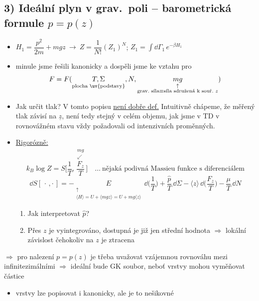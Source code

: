 {\color{NavyBlue}
\subsection*{3) Ideální plyn v grav.\ poli -- barometrická formule $p = p(z)$}
\begin{itemize}
  \item $H_1 = \dfrac{p^2}{2m} + mgz \ \to\ Z = \dfrac{1}{N!}(Z_1)^N$; \quad $Z_1 = \displaystyle\int\dd\Gamma_1\,e^{-\beta H_1}$
  \item minule jsme řešili kanonicky a dospěli jsme ke vztahu pro 
        \[
          F = F(\underset{\text{plocha \uv{podstavy}}}{T,\Sigma},N,\underset{\substack{\uparrow\\ \text{grav.\ síla} \equiv \text{síla sdružená k souř.\ } z}}{mg})
        \]
  \item Jak určit tlak?  V tomto popisu \underline{není dobře def.} Intuitivně chápeme, že  měřený tlak závisí
        na $\underline z$, není tedy stejný v celém objemu, jak jsme v TD v rovnovážném stavu vždy požadovali od intenzivních proměnných.
  \item \underline{Rigorózně:}
        \[
          k_B\log Z = S\Big[\frac1T,\overset{\substack{mg\\ \swarrow}}{\frac{F_z}{T}}\Big]
          \quad\dots\ \text{nějaká podivná Massieu funkce s diferenciálem}
        \]
        \[
          \dd S[\,\cdot\,,\cdot\,] = -\underset{\substack{\uparrow\\ \langle H\rangle = U + \langle mgz\rangle = U + mg\langle z\rangle}}{E}\,\dd\Big(\frac1T\Big)
          + \frac{\hat p}{T}\,\dd\Sigma - \langle z\rangle\,\dd\Big(\frac{F_z}{T}\Big) - \frac\mu T\,\dd N
        \]
        \begin{enumerate}[label=\roman*)]
          \item Jak interpretovat $\hat p$?
          \item Přes $z$ je vyintegrováno, dostupná je již jen střední hodnota $\Rightarrow$ lokální závislost čehokoliv na $z$ je ztracena
        \end{enumerate}
\end{itemize}
$\Rightarrow$ pro nalezení $p = p(z)$ je třeba uvažovat vzájemnou rovnováhu mezi infinitezimálními 
$\Rightarrow$ ideální bude GK soubor, neboť vrstvy mohou vyměňovat částice
\begin{itemize}
  \item vrstvy lze popisovat i kanonicky, ale je to nešikovné
\end{itemize}}

